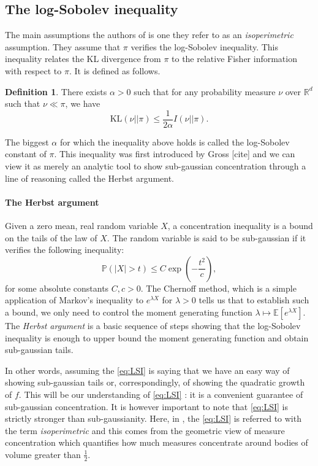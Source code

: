 \documentclass[10pt,journal,a4paper]{IEEEtran}
\theoremstyle{definition}
\newtheorem{definition}{Definition}[section]
\newcommand{\Prb}{\mathbb{P}}
\newcommand{\E}{\mathbb{E}}
\newcommand{\R}{\mathbb{R}}
\newcommand{\KL}{\text{KL}}
\begin{document}
\subsection{The log-Sobolev inequality}

The main assumptions the authors of \cite{vempala_rapid_2019} is one they refer to as an \textit{isoperimetric} assumption. They assume that $\pi$ verifies the log-Sobolev inequality. This inequality relates the KL divergence from $\pi$ to the relative Fisher information with respect to $\pi$. It is defined as follows.

\begin{definition}
  There exists $\alpha >0$ such that for any probability measure $\nu$ over $\R^d$ such that $\nu \ll \pi$, we have
  \begin{equation}
  \KL(\nu || \pi) \leq \frac{1}{2\alpha} I(\nu || \pi).
  \label{eq:LSI}
  \tag{LSI}
  \end{equation}
\end{definition}

The biggest $\alpha$ for which the inequality above holds is called the log-Sobolev constant of $\pi$. This inequality was first introduced by Gross [cite] and we can view it as merely an analytic tool to show sub-gaussian concentration through a line of reasoning called the Herbst argument. 

\begin{boxK}
\paragraph{The Herbst argument} Given a zero mean, real random variable $X$, a concentration inequality is a bound on the tails of the law of $X$. The random variable is said to be sub-gaussian if it verifies the following inequality:
\[
\Prb(|X| > t) \leq C\exp(-\frac{t^2}{c}),
\]
for some absolute constants $C, c > 0$. The Chernoff method, which is a simple application of Markov's inequality to $e^{\lambda X}$ for $\lambda >0$ tells us that to establish such a bound, we only need to control the moment generating function $\lambda \mapsto \E[e^{\lambda X}]$. The \textit{Herbst argument} is a basic sequence of steps showing that the log-Sobolev inequality is enough to upper bound the moment generating function and obtain sub-gaussian tails.
\end{boxK} 

In other words, assuming the \eqref{eq:LSI} is saying that we have an easy way of showing sub-gaussian tails or, correspondingly, of showing the quadratic growth of $f$. This will be our understanding of \eqref{eq:LSI} : it is a convenient guarantee of sub-gaussian concentration. It is however important to note that \eqref{eq:LSI} is strictly stronger than sub-gaussianity. Here, in \cite{vempala_rapid_2019}, the \eqref{eq:LSI} is referred to with the term \textit{isoperimetric} and this comes from the geometric view of measure concentration which quantifies how much measures concentrate around bodies of volume greater than $\frac{1}{2}$.
\end{document}

